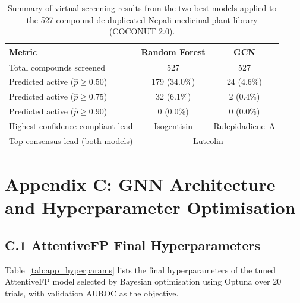 \begin{table}[H]
\caption{Summary of virtual screening results from the two best models applied to the
         527-compound de-duplicated Nepali medicinal plant library (COCONUT 2.0).}
\label{tab:app_vs_summary}
\centering
\begin{tabular}{@{}lcc@{}}
\toprule
\textbf{Metric} & \textbf{Random Forest} & \textbf{GCN} \\
\midrule
Total compounds screened          & 527 & 527 \\
Predicted active ($\hat{p} \geq 0.50$) & 179 (34.0\%) & 24 (4.6\%) \\
Predicted active ($\hat{p} \geq 0.75$) & 32 (6.1\%)   &  2 (0.4\%) \\
Predicted active ($\hat{p} \geq 0.90$) &  0 (0.0\%)   &  0 (0.0\%) \\
Highest-confidence compliant lead & Isogentisin & Rulepidadiene~A \\
Top consensus lead (both models)  & \multicolumn{2}{c}{Luteolin} \\
\bottomrule
\end{tabular}
\end{table}


\clearpage
\section*{Appendix C: GNN Architecture and
          Hyperparameter Optimisation}
\label{app:hyperparams}

\subsection*{C.1 AttentiveFP Final Hyperparameters}

Table~\ref{tab:app_hyperparams} lists the final
hyperparameters of the tuned AttentiveFP model selected
by Bayesian optimisation using Optuna over 20 trials,
with validation AUROC as the objective.

